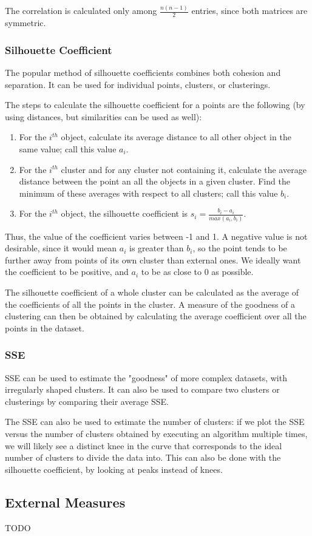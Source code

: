 The correlation is calculated only among $\frac{n(n-1)}{2}$ entries, since both matrices are symmetric.

\subsubsection{Silhouette Coefficient}

The popular method of silhouette coefficients combines both cohesion and separation. It can be used for individual points, clusters, or clusterings.

The steps to calculate the silhouette coefficient for a points are the following (by using distances, but similarities can be used as well):

\begin{enumerate}
    \item For the $i^{th}$ object, calculate its average distance to all other object in the same value; call this value $a_i$.

    \item For the $i^{th}$ cluster and for any cluster not containing it, calculate the average distance between the point an all the objects in a given cluster. Find the minimum of these averages with respect to all clusters; call this value $b_i$.

    \item For the $i^{th}$ object, the silhouette coefficient is $s_i = \frac{b_i - a_i}{max(a_i,b_i)}$.
\end{enumerate}

Thus, the value of the coefficient varies between -1 and 1. A negative value is not desirable, since it would mean $a_i$ is greater than $b_i$, so the point tends to be further away from points of its own cluster than external ones. We ideally want the coefficient to be positive, and $a_i$ to be as close to 0 as possible.

The silhouette coefficient of a whole cluster can be calculated as the average of the coefficients of all the points in the cluster. A measure of the goodness of a clustering can then be obtained by calculating the average coefficient over all the points in the dataset.

\subsubsection{SSE}

SSE can be used to estimate the "goodness" of more complex datasets, with irregularly shaped clusters. It can also be used to compare two clusters or clusterings by comparing their average SSE.

The SSE can also be used to estimate the number of clusters: if we plot the SSE versus the number of clusters obtained by executing an algorithm multiple times, we will likely see a distinct knee in the curve that corresponds to the ideal number of clusters to divide the data into. This can also be done with the silhouette coefficient, by looking at peaks instead of knees.

\subsection{External Measures}

TODO